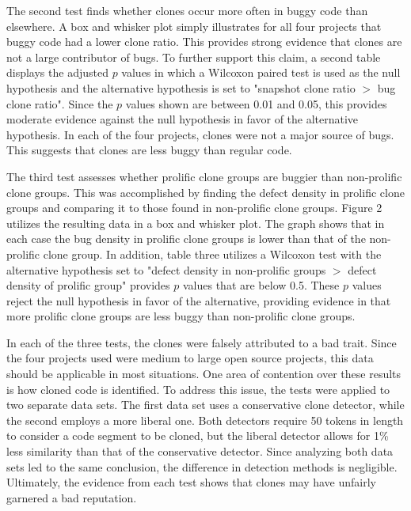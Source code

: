 \documentclass{article}
\begin{document}
The second test finds whether clones occur more often in buggy code than elsewhere. A box
and whisker plot simply illustrates for all four projects that buggy code had a lower clone
ratio. This provides strong evidence that clones are not a large contributor of bugs. To
further support this claim, a second table displays the adjusted $p$ values in which a Wilcoxon
paired test is used as the null hypothesis and the alternative hypothesis is set to "snapshot
clone ratio $>$ bug clone ratio". Since the $p$ values shown are between 0.01 and 0.05, this
provides moderate evidence against the null hypothesis in favor of the alternative hypothesis.
In each of the four projects, clones were not a major source of bugs. This suggests that clones
are less buggy than regular code.

The third test assesses whether prolific clone groups are buggier than non-prolific clone groups.
This was accomplished by finding the defect density in prolific clone groups and comparing it to
those found in non-prolific clone groups. Figure 2 utilizes the resulting data in a box and whisker
plot. The graph shows that in each case the bug density in prolific clone groups is lower than that
of the non-prolific clone group. In addition, table three utilizes a Wilcoxon test with the alternative
hypothesis set to "defect density in non-prolific groups $>$ defect density of prolific group" provides
$p$ values that are below 0.5. These $p$ values reject the null hypothesis in favor of the alternative,
providing evidence in that more prolific clone groups are less buggy than non-prolific clone groups.

In each of the three tests, the clones were falsely attributed to a bad trait. Since the four
projects used were medium to large open source projects, this data should be applicable
in most situations. One area of contention over these results is how cloned code is identified.
To address this issue, the tests were applied to two separate data sets. The first data set
uses a conservative clone detector, while the second employs a more liberal one. Both detectors
require 50 tokens in length to consider a code segment to be cloned, but the liberal detector
allows for 1\% less similarity than that of the conservative detector. Since analyzing both
data sets led to the same conclusion, the difference in detection methods is negligible. Ultimately,
the evidence from each test shows that clones may have unfairly garnered a bad reputation.

\pagebreak
\end{document}
